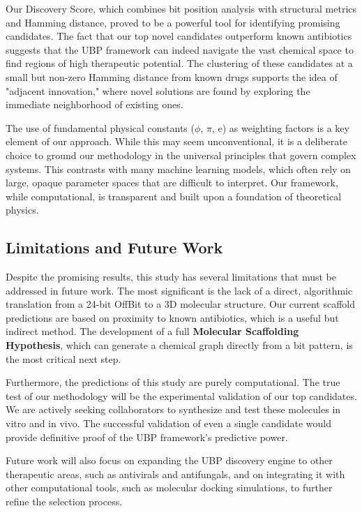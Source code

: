 \documentclass[12pt, a4paper]{article}
\begin{document}
Our Discovery Score, which combines bit position analysis with structural metrics and Hamming distance, proved to be a powerful tool for identifying promising candidates. The fact that our top novel candidates outperform known antibiotics suggests that the UBP framework can indeed navigate the vast chemical space to find regions of high therapeutic potential. The clustering of these candidates at a small but non-zero Hamming distance from known drugs supports the idea of "adjacent innovation," where novel solutions are found by exploring the immediate neighborhood of existing ones.

The use of fundamental physical constants ($\phi$, $\pi$, e) as weighting factors is a key element of our approach. While this may seem unconventional, it is a deliberate choice to ground our methodology in the universal principles that govern complex systems. This contrasts with many machine learning models, which often rely on large, opaque parameter spaces that are difficult to interpret. Our framework, while computational, is transparent and built upon a foundation of theoretical physics.

\subsection{Limitations and Future Work}

Despite the promising results, this study has several limitations that must be addressed in future work. The most significant is the lack of a direct, algorithmic translation from a 24-bit OffBit to a 3D molecular structure. Our current scaffold predictions are based on proximity to known antibiotics, which is a useful but indirect method. The development of a full \textbf{Molecular Scaffolding Hypothesis}, which can generate a chemical graph directly from a bit pattern, is the most critical next step.

Furthermore, the predictions of this study are purely computational. The true test of our methodology will be the experimental validation of our top candidates. We are actively seeking collaborators to synthesize and test these molecules in vitro and in vivo. The successful validation of even a single candidate would provide definitive proof of the UBP framework's predictive power.

Future work will also focus on expanding the UBP discovery engine to other therapeutic areas, such as antivirals and antifungals, and on integrating it with other computational tools, such as molecular docking simulations, to further refine the selection process.
\end{document}
